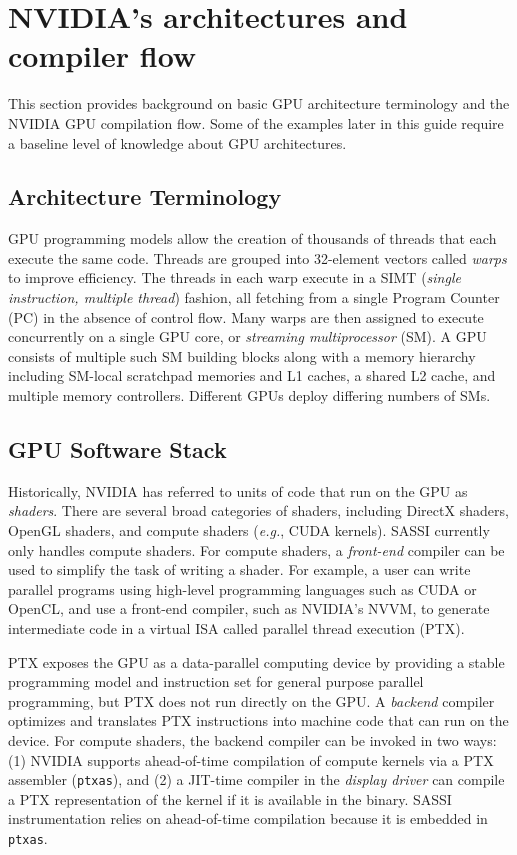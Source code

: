 \section{NVIDIA's architectures and compiler flow}

This section provides background on basic GPU architecture terminology
and the NVIDIA GPU compilation flow.  Some of the examples later in
this guide require a baseline level of knowledge about GPU
architectures. 

\subsection{Architecture Terminology}

GPU programming models allow the creation of thousands of threads that
each execute the same code. Threads are grouped into 32-element
vectors called \emph{warps} to improve efficiency. The threads in each
warp execute in a SIMT (\emph{single instruction, multiple thread})
fashion, all fetching from a single Program Counter (PC) in the
absence of control flow.  Many warps are then assigned to execute
concurrently on a single GPU core, or \emph{streaming multiprocessor}
(SM). A GPU consists of multiple such SM building blocks along with a
memory hierarchy including SM-local scratchpad memories and L1 caches,
a shared L2 cache, and multiple memory controllers. Different GPUs
deploy differing numbers of SMs.

\subsection{GPU Software Stack}

Historically, NVIDIA has referred to units of code that run on the GPU
as \emph{shaders}.  There are several broad categories of shaders,
including DirectX shaders, OpenGL shaders, and compute shaders
(\emph{e.g.}, CUDA kernels).  SASSI currently only handles compute
shaders.  For compute shaders, a \emph{front-end} compiler can be used
to simplify the task of writing a shader.  For example, a user can
write parallel programs using high-level programming languages such as
CUDA or OpenCL, and use a front-end compiler, such as NVIDIA's NVVM,
to generate intermediate code in a virtual ISA called parallel thread
execution (PTX)\@.

PTX exposes the GPU as a data-parallel computing device by providing a
stable programming model and instruction set for general purpose
parallel programming, but PTX does not run directly on the GPU\@. A
\emph{backend} compiler optimizes and translates PTX instructions into
machine code that can run on the device. For compute shaders, the
backend compiler can be invoked in two ways: (1) NVIDIA supports
ahead-of-time compilation of compute kernels via a PTX assembler
(\texttt{ptxas}), and (2) a JIT-time compiler in the \emph{display
  driver} can compile a PTX representation of the kernel if it is
available in the binary.  SASSI instrumentation relies on
ahead-of-time compilation because it is embedded in \texttt{ptxas}. 

